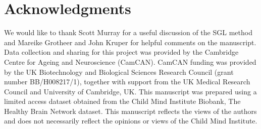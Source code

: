 \documentclass[10pt,letterpaper]{article}
\begin{document}
\section*{Acknowledgments}

We would like to thank Scott Murray for a useful discussion of the SGL method
and Mareike Grotheer and John Kruper
for helpful comments on the manuscript.
Data collection and sharing for this project was provided by the Cambridge Centre for Ageing and Neuroscience (CamCAN). CamCAN funding was provided by the UK Biotechnology and Biological Sciences Research Council (grant number BB/H008217/1), together with support from the UK Medical Research Council and University of Cambridge, UK. This manuscript was prepared using a limited access dataset obtained from the Child Mind Institute Biobank, The Healthy Brain Network dataset. This manuscript reflects the views of the authors and does not necessarily reflect the opinions or views of the Child Mind Institute.

\nolinenumbers

% 
\end{document}
